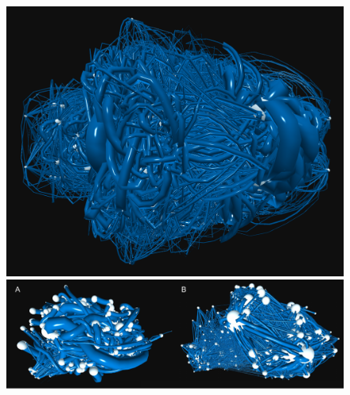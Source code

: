 \documentclass[endfloats,nofootinbib,preprint,floatfix,titlepage,superscriptaddress,linenumbers]{revtex4-1} %
\begin{document}
{\begin{figure}[ht]
    \centering
    \includegraphics[width=.6\textwidth]{fig-09-19/mouse-brain-20k-top.png}
    \includegraphics[width=\textwidth]{fig-09-19/brain-3.pdf}
    

\end{figure}}
\end{document}
